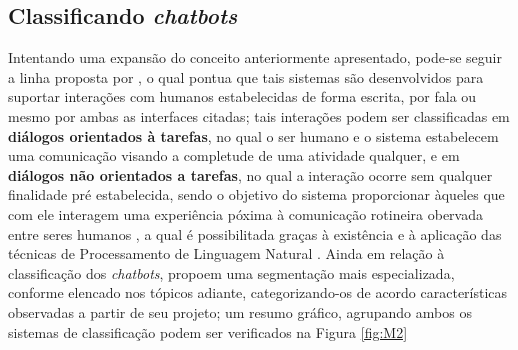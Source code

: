 \subsection{Classificando \textit{chatbots}}
Intentando uma expansão do conceito anteriormente apresentado, pode-se seguir a linha proposta por , o qual pontua que tais sistemas são desenvolvidos para suportar interações com humanos estabelecidas de forma escrita, por fala ou mesmo por ambas as interfaces citadas; tais interações podem ser classificadas em \textbf{diálogos orientados à tarefas}, no qual o ser humano e o sistema estabelecem uma comunicação visando a completude de uma atividade qualquer, e em \textbf{diálogos não orientados a tarefas}, no qual a interação ocorre sem qualquer finalidade pré estabelecida, sendo o objetivo do sistema proporcionar àqueles que com ele interagem uma experiência póxima à comunicação rotineira obervada entre seres humanos \cite{wezel2020m}, a qual é possibilitada graças à existência e à aplicação das técnicas de Processamento de Linguagem Natural \cite{lokman2018modern}. Ainda em relação à classificação dos \textit{chatbots},  propoem uma segmentação mais especializada, conforme elencado nos tópicos adiante, categorizando-os de acordo características observadas a partir de seu projeto; um resumo gráfico, agrupando ambos os sistemas de classificação podem ser verificados na Figura \ref{fig:M2}

